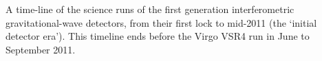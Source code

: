 \label{figure:runtimes}
A time-line of the science runs of the first generation interferometric gravitational-wave detectors, from their first lock to mid-2011 (the `initial detector era'). This timeline ends before the Virgo VSR4 run in June to September 2011.
